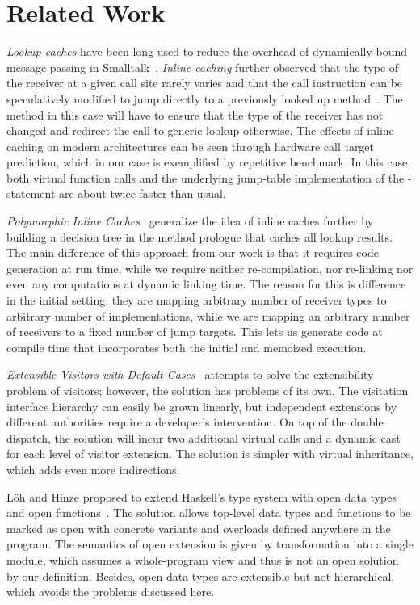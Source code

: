 \section{Related Work} %
\label{sec:rw}

\emph{Lookup caches} have been long used to reduce the overhead of 
dynamically-bound message passing in Smalltalk~\cite{UngarPatterson83}. 
\emph{Inline caching} further observed that the type of the receiver at a given 
call site rarely varies and that the call instruction can be speculatively 
modified to jump directly to a previously looked up method~\cite{Deutsch84}. 
The method in this case will have to ensure that the type of the receiver has 
not changed and redirect the call to generic lookup otherwise. The effects of 
inline caching on modern architectures can be seen through hardware call target 
prediction, which in our case is exemplified by repetitive benchmark. In this 
case, both virtual function calls and the underlying jump-table implementation of 
the -statement are about twice faster than usual.

\emph{Polymorphic Inline Caches}~\cite{Holzle:Chambers:Ungar:91} generalize the 
idea of inline caches further by building a decision tree in the method prologue 
that caches all lookup results. The main difference of this approach from our 
work is that it requires code generation at run time, while we require neither 
re-compilation, nor re-linking nor even any computations at dynamic linking 
time. The reason for this is difference in the initial setting: they are mapping 
arbitrary number of receiver types to arbitrary number of implementations, while 
we are mapping an arbitrary number of receivers to a fixed number of jump 
targets. This lets us generate code at compile time that incorporates both the 
initial and memoized execution.

\emph{Extensible Visitors with Default Cases}~\cite[]{Zenger:2001} attempts to solve the extensibility problem of visitors; 
however, the solution has problems of its own. The visitation interface 
hierarchy can easily be grown linearly, but independent extensions by different  
authorities require a developer's intervention. On top of the double dispatch, the 
solution will incur two additional virtual calls and a dynamic cast for each 
level of visitor extension. The solution is simpler with virtual inheritance, 
which adds even more indirections.

L\"{o}h and Hinze proposed to extend Haskell's type system with open data types 
and open functions~\cite{LohHinze2006}. The solution allows top-level data types 
and functions to be marked as open with concrete variants and overloads defined 
anywhere in the program. The semantics of open extension is given by 
transformation into a single module, which assumes a whole-program view and thus 
is not an open solution by our definition. Besides, open data types are extensible but not 
hierarchical, which avoids the problems discussed here.

